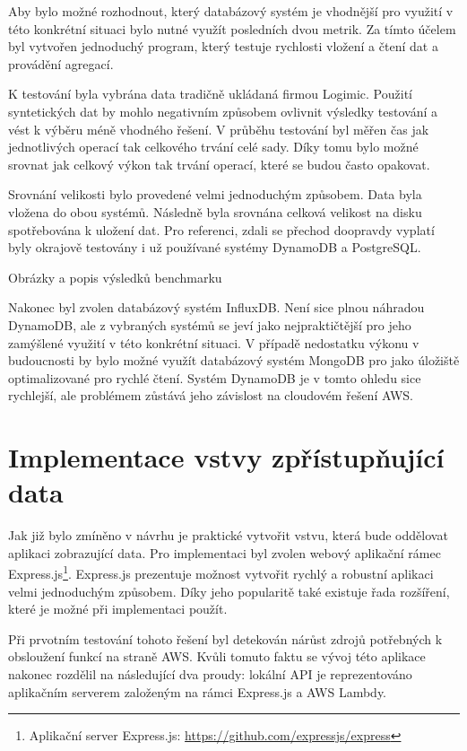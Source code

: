 Aby bylo možné rozhodnout, který databázový systém je vhodnější pro využití v této konkrétní situaci bylo nutné využít posledních dvou metrik. Za tímto účelem byl vytvořen jednoduchý program, který testuje rychlosti vložení a čtení dat a provádění agregací. 

K testování byla vybrána data tradičně ukládaná firmou Logimic. Použití syntetických dat by mohlo negativním způsobem ovlivnit výsledky testování a vést k výběru méně vhodného řešení. V průběhu testování byl měřen čas jak jednotlivých operací tak celkového trvání celé sady. Díky tomu bylo možné srovnat jak celkový výkon tak trvání operací, které se budou často opakovat.

Srovnání velikosti bylo provedené velmi jednoduchým způsobem. Data byla vložena do obou systémů. Následně byla srovnána celková velikost na disku spotřebována k uložení dat. Pro referenci, zdali se přechod doopravdy vyplatí byly okrajově testovány i už používané systémy DynamoDB a PostgreSQL.

Obrázky a popis výsledků benchmarku

Nakonec byl zvolen databázový systém InfluxDB. Není sice plnou náhradou DynamoDB, ale z vybraných systémů se jeví jako nejpraktičtější pro jeho zamýšlené využití v této konkrétní situaci. V případě nedostatku výkonu v budoucnosti by bylo možné využít databázový systém MongoDB pro jako úložiště optimalizované pro rychlé čtení. Systém DynamoDB je v tomto ohledu sice rychlejší, ale problémem zůstává jeho závislost na cloudovém řešení AWS.

\section{Implementace vstvy zpřístupňující data}
Jak již bylo zmíněno v návrhu je praktické vytvořit vstvu, která bude oddělovat aplikaci zobrazující data. Pro implementaci byl zvolen webový aplikační rámec Express.js\footnote{Aplikační server Express.js: \url{https://github.com/expressjs/express}}. Express.js prezentuje možnost vytvořit rychlý a robustní aplikaci velmi jednoduchým způsobem. Díky jeho popularitě také existuje řada rozšíření, které je možné při implementaci použít. 

Při prvotním testování tohoto řešení byl detekován nárůst zdrojů potřebných k obsloužení funkcí na straně AWS. Kvůli tomuto faktu se vývoj této aplikace nakonec rozdělil na následující dva proudy: lokální API je reprezentováno aplikačním serverem založeným na rámci Express.js a AWS Lambdy.

